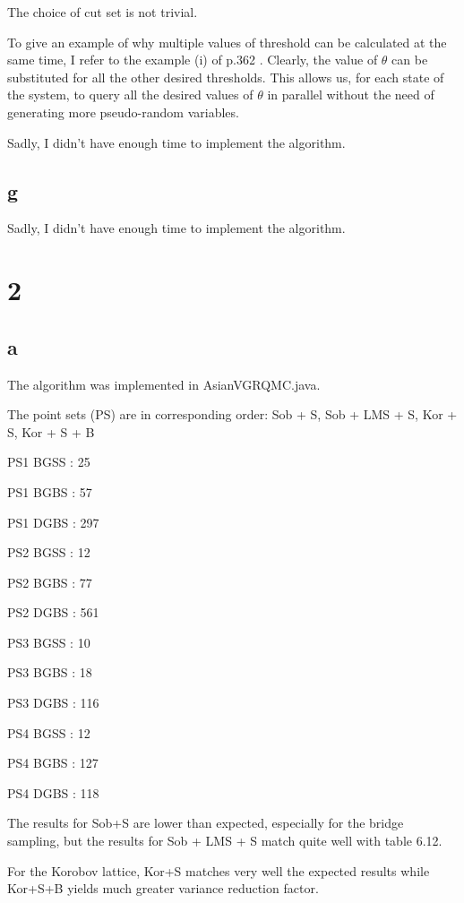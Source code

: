 \documentclass[12pt]{report}
\begin{document}
The choice of cut set is not trivial.

To give an example of why multiple values of threshold can be calculated at the same time, I refer to the example (i) of p.362 \citep{fu_sensitivity_2006}. Clearly, the value of $\theta$ can be substituted for all the other desired thresholds. This allows us, for each state of the system, to query all the desired values of $\theta$ in parallel without the need of generating more pseudo-random variables.


Sadly, I didn't have enough time to implement the algorithm.

\subsection*{g}
Sadly, I didn't have enough time to implement the algorithm.

\section*{2}



\subsection*{a}

The algorithm was implemented in AsianVG\textunderscore RQMC.java.

The point sets (PS) are in corresponding order: Sob + S, Sob + LMS + S, Kor + S, Kor + S + B

PS1 BGSS : 25

PS1 BGBS :  57

PS1 DGBS :  297

PS2 BGSS :  12

PS2 BGBS :  77

PS2 DGBS :  561

PS3 BGSS :  10

PS3 BGBS :  18

PS3 DGBS :  116

PS4 BGSS :  12

PS4 BGBS :  127

PS4 DGBS :  118


The results for Sob+S are lower than expected, especially for the bridge sampling, but the results for Sob + LMS + S match quite well with table 6.12.

For the Korobov lattice, Kor+S matches very well the expected results while Kor+S+B yields much greater variance reduction factor.
\end{document}
